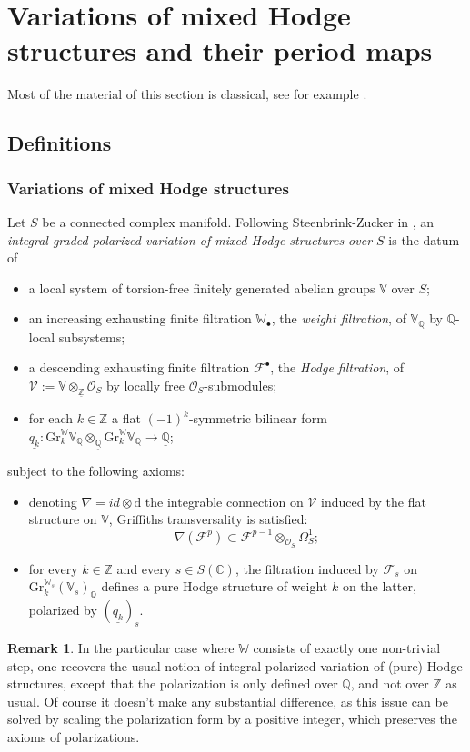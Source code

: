 \documentclass[10pt]{article}
\numberwithin{equation}{subsection}
\theoremstyle{plain}
\theoremstyle{definition}
\newtheorem{remark}[theorem]{Remark}
\theoremstyle{remark}
\newcommand{\Z}{\mathbb Z}
\newcommand{\uZ}{\underline{\mathbb{Z}}}
\newcommand{\Q}{\mathbb Q}
\newcommand{\uQ}{\underline{\mathbb{Q}}}
\newcommand{\C}{\mathbb C}
\newcommand{\V}{\mathbb V}
\newcommand{\W}{\mathbb W}
\newcommand{\bul}{\bullet}
\newcommand{\Gr}{\mathrm{Gr}}
\begin{document}
\section{Variations of mixed Hodge structures and their period maps}\label{sect3}
Most of the material of this section is classical, see for example \cite{petste,pearls,klingler_atyp,klingao}. 
\subsection{Definitions}
\subsubsection*{Variations of mixed Hodge structures}
Let $S$ be a connected complex manifold. Following Steenbrink-Zucker in \cite{sz}, an \textit{integral graded-polarized variation of mixed Hodge structures over $S$} is the datum of
\begin{itemize}
\item a local system of torsion-free finitely generated abelian groups $\V$ over $S$;
\item an increasing exhausting finite filtration $\W_\bul$, the \textit{weight filtration}, of $\V_\Q$ by $\Q$-local subsystems;
\item a descending exhausting finite filtration $\mathcal{F}^\bul$, the \textit{Hodge filtration}, of $\mathcal{V} := \V \otimes_{\uZ} \mathcal{O}_S$ by locally free $\mathcal{O}_S$-submodules;
\item for each $k\in \Z$ a flat $(-1)^k$-symmetric bilinear form $\underline{q_k} : \Gr_k^\W\V_\Q \otimes _{\uQ} \Gr_k^\W\V_\Q \rightarrow  \uQ$;
\end{itemize}
subject to the following axioms:
\begin{itemize}
\item denoting $\nabla = id \otimes \mathrm{d}$ the integrable connection on $\mathcal{V}$ induced by the flat structure on $\V$, Griffiths transversality is satisfied:
\[
\nabla(\mathcal{F}^p) \subset \mathcal{F}^{p-1} \otimes_{\mathcal{O}_S} \Omega^1_S;
\]
\item for every $k \in \Z$ and every $s \in S(\C)$, the filtration induced by $\mathcal{F}_s$ on $\Gr_k^{\W_s} (\V_s)_\Q$ defines a pure Hodge structure of weight $k$ on the latter, polarized by $(\underline{q_k})_s$.
\end{itemize}
\begin{remark}
In the particular case where $\W$ consists of exactly one non-trivial step, one recovers the usual notion of integral polarized variation of (pure) Hodge structures, except that the polarization is only defined over $\Q$, and not over $\Z$ as usual. Of course it doesn't make any substantial difference, as this issue can be solved by scaling the polarization form by a positive integer, which preserves the axioms of polarizations.
\end{remark}
\end{document}
